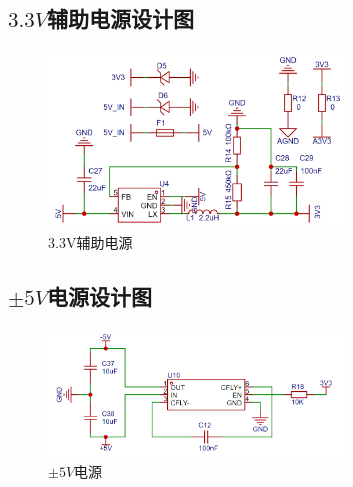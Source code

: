 \documentclass[a4paper,12pt]{article}
\begin{document}
\subsection{$3.3V$辅助电源设计图}
\begin{figure}[h]
    \centering
    \includegraphics[width=0.7\textwidth]{src/fig10.png}
    \caption{3.3V辅助电源}
    \label{fig10}
\end{figure}
\subsection{$\pm 5V$电源设计图}
\begin{figure}[h]
    \centering
    \includegraphics[width=0.7\textwidth]{src/fig9.png}
    \caption{$\pm 5V$电源}
    \label{fig9}
\end{figure}
\end{document}
